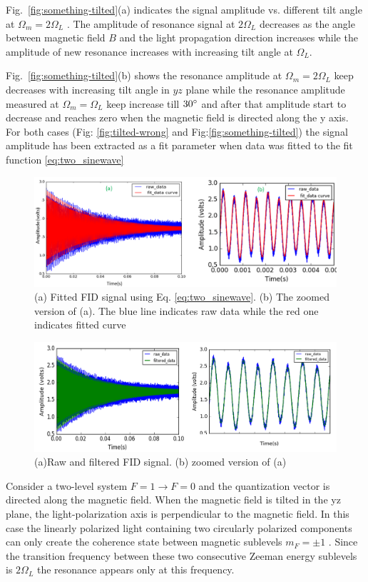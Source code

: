 Fig.~\ref{fig:something-tilted}(a) indicates the signal amplitude vs. different tilt angle at $\Omega_m=2\Omega_L$ . The amplitude of resonance signal at $2\Omega_L$  decreases as the angle between magnetic field $B$ and the light propagation direction increases while the amplitude of new resonance  increases with increasing tilt angle at $\Omega_L$.
      
Fig.~\ref{fig:something-tilted}(b) shows the resonance amplitude at $\Omega_m=2\Omega_L$ keep decreases with increasing tilt angle in $yz$ plane while  the resonance amplitude measured at $\Omega_m=\Omega_L$ keep increase till $30\degree$ and after that amplitude start to decrease and reaches zero when the magnetic field is directed along the y axis. For both cases (Fig: \ref{fig:tilted-wrong} and Fig:\ref{fig:something-tilted}) the signal amplitude has been extracted as a fit parameter when data was fitted to the fit function \ref{eq:two_sinewave}
\begin{figure}[h]
\centering\includegraphics[width=0.9\linewidth]{figures/fitted_data_tilted_field.png}
\caption{(a) Fitted FID signal using Eq. \ref{eq:two_sinewave}. (b)  The zoomed version of (a). The  blue line indicates raw data while the red one indicates fitted curve}
\end{figure}
\begin{figure}[h]
\centering\includegraphics[width=0.9\linewidth]{figures/filtered_data.png}
\caption{(a)Raw and filtered FID signal. (b) zoomed version of (a)}
\end{figure}

Consider a two-level system $F=1\rightarrow F=0$ and the quantization vector is directed along the magnetic field. When the magnetic field is tilted in the yz plane, the light-polarization axis is perpendicular to the magnetic field. In this case the linearly polarized light containing two circularly polarized components can only create the coherence state between magnetic sublevels $m_F=\pm 1$ . Since the transition frequency between these two consecutive Zeeman energy sublevels is $2\Omega_L$  the resonance appears only at this frequency. 

